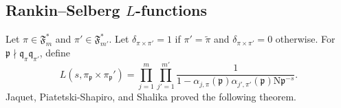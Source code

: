 \documentclass[12pt,reqno]{amsart}
\theoremstyle{remark}
\newcommand{\N}{\mathrm{N}}
\newcommand{\kp}{\mathfrak{p}}
\newcommand{\kq}{\mathfrak{q}}
\numberwithin{equation}{section}
\begin{document}

	
	
	\subsection{Rankin--Selberg \texorpdfstring{$L$}{L}-functions}
	\label{subsec:RS}



    Let $\pi\in\mathfrak{F}_{m}^*$ and $\pi'\in\mathfrak{F}_{m'}^*$.  Let $\delta_{\pi\times\pi'}=1$ if $\pi'=\widetilde{\pi}$ and $\delta_{\pi\times\pi'}=0$ otherwise.  For $\kp\nmid\kq_{\pi}\kq_{\pi'}$, define
\[
L(s,\pi_{\kp}\times\pi_{\kp}')=\prod_{j=1}^m \prod_{j'=1}^{m'}\frac{1}{1-\alpha_{j,\pi}(\kp)\alpha_{j',\pi'}(\kp)\N\kp^{-s}}.
\]
Jaquet, Piatetski-Shapiro, and Shalika proved the following theorem.
\end{document}
